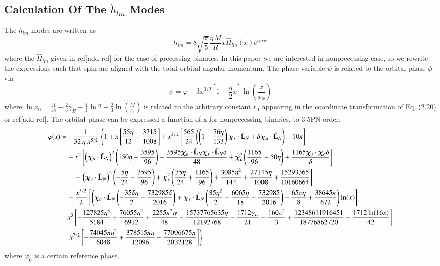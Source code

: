 \documentclass[prd,preprintnumbers,twocolumn,eqsecnum,floatfix,letter]{revtex4}
\begin{document}
\begin{widetext}
\section{Calculation Of The $\dot{h}_{lm}$ Modes}
The $h_{lm}$ modes are written as 
\begin{equation}
	h_{lm}=8\sqrt{\frac{\pi}{5}}\frac{\eta\,M}{R}x\hat{H}_{lm}(x)e^{\mathit{i}m\psi}
\end{equation}
where the $\hat{H}_{lm}$ given in ref[add ref] for the case of precessing binaries. In this paper we are interested in nonprecessing case, so we rewrite the expressions such that spin are aligned with the total orbital angular momentum. The phase variable $\psi$ is related to the orbital phase $\phi$ via
\begin{equation}
	\psi=\varphi - 3x^{3/2}\left[1-\frac{\eta}{2}x\right]\ln\left(\frac{x}{x_0}\right)
\end{equation}
where $\ln x_0 = \frac{11}{18} - \frac{2}{3}\gamma_E -\frac{4}{3}\ln2 + \frac{2}{3}\ln\left(\frac{M}{r_0}\right)$ is related to the arbitrary constant $r_0$ appearing in the coordinate transformation of Eq. (2.20) or ref[add ref]. The orbital phase can be expressed a function of x for nonprecessing binaries, to 3.5PN order.
\begin{align}
\varphi(x)& = -\frac{1}{32\,\eta\,x^{5/2}}\left\{1+x\left[\frac{55\eta}{12}+\frac{3715}{1008}\right]+x^{3/2}\left[\frac{565}{24}\left(\left(1-\frac{76\eta}{133}\right)\bm{\chi}_s \cdot \hat{\mathbf{L}}_N + \delta\bm{\chi}_a \cdot \hat{\mathbf{L}}_N\right)-10\pi\right]\right.\nonumber\\
&\quad + x^2\left[\left(\bm{\chi}_a \cdot \hat{\mathbf{L}}_N\right)^2\left(150\eta-\frac{3595}{96}\right)-\frac{3595\bm{\chi}_a \cdot \hat{\mathbf{L}}_N\bm{\chi}_s \cdot \hat{\mathbf{L}}_N\delta}{48} + \bm{\chi}_a^2\left(\frac{1165}{96}- 50\eta\right) + \frac{1165\bm{\chi}_s \cdot \bm{\chi}_a\delta}{\delta}\right]\nonumber\\
&\qquad + \left.\left(\bm{\chi}_s \cdot \hat{\mathbf{L}}_N\right)^2\left(-\frac{5\eta}{24} - \frac{3595}{96}\right) + \bm{\chi}_s^2\left(\frac{35\eta}{24}+\frac{1165}{96}\right) + \frac{3085\eta^2}{144} + \frac{27145\eta}{1008} + \frac{15293365}{10160664}\right]\nonumber\\
&\quad +  \frac{x^{5/2}}{2}\left[\left(\bm{\chi}_a \cdot \hat{\mathbf{L}}_N\left(-\frac{35\delta\eta}{2} - \frac{732985\delta}{2016}\right) + \bm{\chi}_s \cdot \hat{\mathbf{L}}_N\left(\frac{85\eta^2}{2} + \frac{6065\eta}{18} - \frac{732985}{2016}\right) -\frac{65\pi\eta}{8} + \frac{38645\pi}{672}\right)\ln(x)\right]\nonumber\\
&\quad x^3\left[-\frac{127825\eta^3}{5184} + \frac{76055\eta^2}{6912} + \frac{2255\pi^2\eta}{48} - \frac{15737765635\eta}{12192768} - \frac{1712\gamma_E}{21} -\frac{160\pi^2}{3} + \frac{12348611916451}{18776862720} - \frac{1712\ln(16x)}{42}\right]\nonumber\\
&\quad \left.x^{7/2}\left[-\frac{74045\pi\eta^2}{6048} + \frac{378515\pi\eta}{12096} + \frac{77096675\pi}{2032128}\right]\right\}
\end{align} 
where $\varphi_0$ is a certain reference phase.	


\end{widetext}
\end{document}
